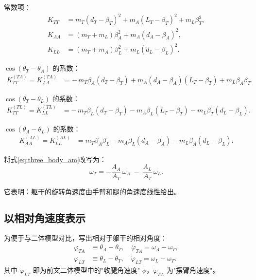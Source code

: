 \documentclass{article}
\begin{document}
常数项：
\begin{align}
K_{TT} &= m_T(d_T - \beta_T)^2 + m_A(L_T - \beta_T)^2 + m_L\beta_T^2, \label{eq:KTT} \\
K_{AA} &= (m_T + m_L)\beta_A^2 + m_A(d_A - \beta_A)^2, \label{eq:KAA_const} \\
K_{LL} &= (m_T + m_A)\beta_L^2 + m_L(d_L - \beta_L)^2. \label{eq:KLL_const}
\end{align}

$\cos(\theta_T-\theta_A)$ 的系数：
\begin{align}
K_{TT}^{(TA)} = K_{AA}^{(TA)} &= -\,m_T\beta_A(d_T-\beta_T)
                                 + m_A(d_A-\beta_A)(L_T-\beta_T)
                                 + m_L\beta_A\beta_T. \label{eq:K_TA}
\end{align}

$\cos(\theta_T-\theta_L)$ 的系数：
\begin{align}
K_{TT}^{(TL)} = K_{LL}^{(TL)} &= -\,m_T\beta_L(d_T-\beta_T)
                                 - m_A\beta_L(L_T-\beta_T)
                                 - m_L\beta_T(d_L-\beta_L). \label{eq:K_TL}
\end{align}

$\cos(\theta_A-\theta_L)$ 的系数：
\begin{align}
K_{AA}^{(AL)} = K_{LL}^{(AL)} &= m_T\beta_A\beta_L
                                 - m_A\beta_L(d_A-\beta_A)
                                 - m_L\beta_A(d_L-\beta_L). \label{eq:K_AL}
\end{align}

将式\eqref{eq:three_body_am}改写为：
\begin{equation}
\boxed{\omega_T = -\frac{A_A}{A_T}\,\omega_A \;-\; \frac{A_L}{A_T}\,\omega_L}. \label{eq:mechanical_connection}
\end{equation}

它表明：躯干的旋转角速度由手臂和腿的角速度线性给出。

\subsection{以相对角速度表示}

为便于与二体模型对比，写出相对于躯干的相对角度：
\begin{align}
\varphi_{TA} &\equiv \theta_A - \theta_T, \quad \dot\varphi_{TA} = \omega_A - \omega_T, \label{eq:phiTA} \\
\varphi_{LT} &\equiv \theta_L - \theta_T, \quad \dot\varphi_{LT} = \omega_L - \omega_T. \label{eq:phiLT}
\end{align}
其中 $\dot\varphi_{LT}$ 即为前文二体模型中的"收腿角速度" $\dot\phi$，$\dot\varphi_{TA}$ 为"摆臂角速度"。
\end{document}
